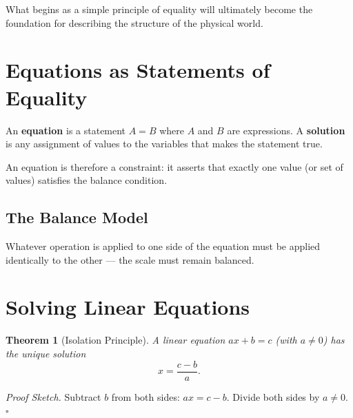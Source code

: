 \documentclass[11pt, openany]{book}
\theoremstyle{plain}
\newtheorem{theorem}{Theorem}[chapter]
\theoremstyle{definition}
\theoremstyle{remark}
\newenvironment{proofsketch}{\noindent\textit{Proof Sketch.}\;}{\hfill$\square$\par\medskip}
\begin{document}
What begins as a simple principle of equality will ultimately become the
foundation for describing the structure of the physical world.

\section{Equations as Statements of Equality}

\begin{mydefinition}
An \textbf{equation} is a statement $A=B$ where $A$ and $B$ are expressions.
A \textbf{solution} is any assignment of values to the variables that makes
the statement true.
\end{mydefinition}

An equation is therefore a constraint: it asserts that exactly one value (or
set of values) satisfies the balance condition.

\subsection{The Balance Model}

\begin{center}
\end{center}

Whatever operation is applied to one side of the equation must be applied
identically to the other --- the scale must remain balanced.

\section{Solving Linear Equations}

\begin{theorem}[Isolation Principle]
A linear equation $ax+b=c$ (with $a\ne0$) has the unique solution
\[
  x = \frac{c-b}{a}.
\]
\end{theorem}

\begin{proofsketch}
Subtract $b$ from both sides: $ax=c-b$. Divide both sides by $a\ne0$.
\end{proofsketch}
\end{document}
